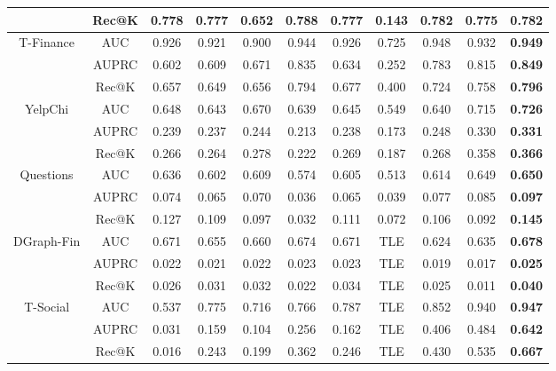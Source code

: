 \begin{table}[htbp!]
{\begin{tabular}{cc|ccccccccc}
                            & Rec@K   & 0.778 & 0.777 & 0.652 & \textbf{0.788}     & 0.777 & 0.143 & 0.782    & 0.775     & 0.782          \\ \hline
\multirow{3}{*}{T-Finance}  & AUC     & 0.926 & 0.921 & 0.900 & 0.944     & 0.926 & 0.725 & 0.948    & 0.932     & \textbf{0.949} \\
                            & AUPRC   & 0.602 & 0.609 & 0.671 & 0.835     & 0.634 & 0.252 & 0.783    & 0.815     & \textbf{0.849} \\
                            & Rec@K   & 0.657 & 0.649 & 0.656 & 0.794     & 0.677 & 0.400 & 0.724    & 0.758     & \textbf{0.796} \\ \hline
\multirow{3}{*}{YelpChi}    & AUC     & 0.648 & 0.643 & 0.670 & 0.639     & 0.645 & 0.549 & 0.640    & 0.715     & \textbf{0.726} \\
                            & AUPRC   & 0.239 & 0.237 & 0.244 & 0.213     & 0.238 & 0.173 & 0.248    & 0.330     & \textbf{0.331} \\
                            & Rec@K   & 0.266 & 0.264 & 0.278 & 0.222     & 0.269 & 0.187 & 0.268    & 0.358     & \textbf{0.366} \\ \hline
\multirow{3}{*}{Questions}  & AUC     & 0.636 & 0.602 & 0.609 & 0.574     & 0.605 & 0.513 & 0.614    & 0.649     & \textbf{0.650} \\
                            & AUPRC   & 0.074 & 0.065 & 0.070 & 0.036     & 0.065 & 0.039 & 0.077    & 0.085     & \textbf{0.097} \\
                            & Rec@K   & 0.127 & 0.109 & 0.097 & 0.032     & 0.111 & 0.072 & 0.106    & 0.092     & \textbf{0.145} \\ \hline
\multirow{3}{*}{DGraph-Fin} & AUC     & 0.671 & 0.655 & 0.660 & 0.674     & 0.671 & TLE   & 0.624    & 0.635     & \textbf{0.678} \\
                            & AUPRC   & 0.022 & 0.021 & 0.022 & 0.023     & 0.023 & TLE   & 0.019    & 0.017     & \textbf{0.025} \\
                            & Rec@K   & 0.026 & 0.031 & 0.032 & 0.022     & 0.034 & TLE   & 0.025    & 0.011     & \textbf{0.040} \\ \hline
\multirow{3}{*}{T-Social}   & AUC     & 0.537 & 0.775 & 0.716 & 0.766     & 0.787 & TLE   & 0.852    & 0.940     & \textbf{0.947} \\
                            & AUPRC   & 0.031 & 0.159 & 0.104 & 0.256     & 0.162 & TLE   & 0.406    & 0.484     & \textbf{0.642} \\
                            & Rec@K   & 0.016 & 0.243 & 0.199 & 0.362     & 0.246 & TLE   & 0.430    & 0.535     & \textbf{0.667} \\  \hline \hline
\end{tabular}
}
\end{table}